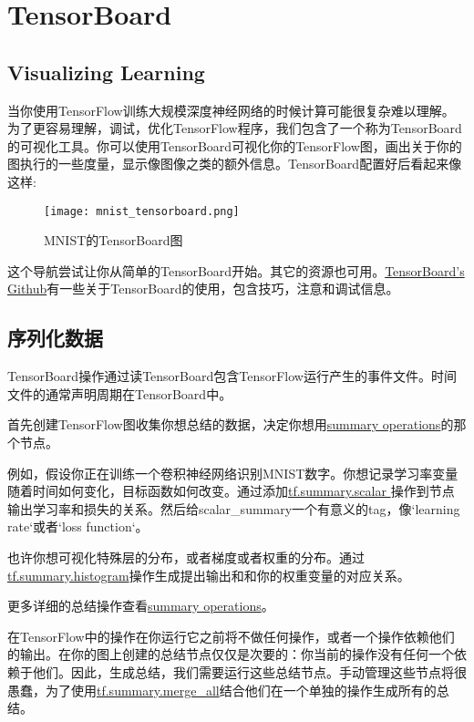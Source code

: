 \section{TensorBoard}
 \subsection{Visualizing Learning}\label{subsec:visualize}
 当你使用TensorFlow训练大规模深度神经网络的时候计算可能很复杂难以理解。为了更容易理解，调试，优化TensorFlow程序，我们包含了一个称为TensorBoard的可视化工具。你可以使用TensorBoard可视化你的TensorFlow图，画出关于你的图执行的一些度量，显示像图像之类的额外信息。TensorBoard配置好后看起来像这样:
 \begin{figure}[!ht]
 \centering
 \texttt{[image: mnist\_tensorboard.png]}
 \caption{MNIST的TensorBoard图}
 \end{figure}
 这个导航尝试让你从简单的TensorBoard开始。其它的资源也可用。\href{https://github.com/tensorflow/tensorboard}{TensorBoard's Github}有一些关于TensorBoard的使用，包含技巧，注意和调试信息。
 
 \subsection{序列化数据}
 TensorBoard操作通过读TensorBoard包含TensorFlow运行产生的事件文件。时间文件的通常声明周期在TensorBoard中。
 
 首先创建TensorFlow图收集你想总结的数据，决定你想用\href{https://www.tensorflow.org/api_guides/python/summary}{summary operations}的那个节点。
 
 例如，假设你正在训练一个卷积神经网络识别MNIST数字。你想记录学习率变量随着时间如何变化，目标函数如何改变。通过添加\href{https://www.tensorflow.org/api_docs/python/tf/summary/scalar}{tf.summary.scalar }操作到节点输出学习率和损失的关系。然后给scalar\_summary一个有意义的tag，像`learning rate`或者`loss function`。
 
 也许你想可视化特殊层的分布，或者梯度或者权重的分布。通过\href{https://www.tensorflow.org/api_docs/python/tf/summary/histogram}{tf.summary.histogram}操作生成提出输出和和你的权重变量的对应关系。
 
 更多详细的总结操作查看\href{https://www.tensorflow.org/api_guides/python/summary}{summary operations}。
 
 在TensorFlow中的操作在你运行它之前将不做任何操作，或者一个操作依赖他们的输出。在你的图上创建的总结节点仅仅是次要的：你当前的操作没有任何一个依赖于他们。因此，生成总结，我们需要运行这些总结节点。手动管理这些节点将很愚蠢，为了使用\href{https://www.tensorflow.org/api_docs/python/tf/summary/merge_all}{tf.summary.merge\_all}结合他们在一个单独的操作生成所有的总结。
 
